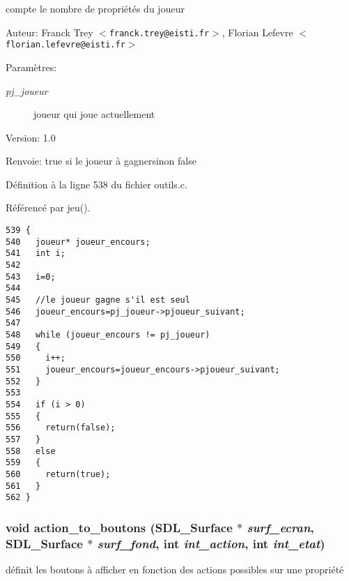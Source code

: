 compte le nombre de propri\'{e}t\'{e}s du joueur 

\begin{Desc}
\item[Auteur:]Franck Trey $<${\tt franck.trey@eisti.fr}$>$, Florian Lefevre $<${\tt florian.lefevre@eisti.fr}$>$\end{Desc}
\begin{Desc}
\item[Param\`{e}tres:]
\begin{description}
\item[{\em pj\_\-joueur}]joueur qui joue actuellement\end{description}
\end{Desc}
\begin{Desc}
\item[Version:]1.0 \end{Desc}
\begin{Desc}
\item[Renvoie:]true si le joueur \`{a} gagnersinon false \end{Desc}


D\'{e}finition \`{a} la ligne 538 du fichier outils.c.

R\'{e}f\'{e}renc\'{e} par jeu().

\begin{Code}\begin{verbatim}539 {
540   joueur* joueur_encours;
541   int i;
542   
543   i=0;
544   
545   //le joueur gagne s'il est seul
546   joueur_encours=pj_joueur->pjoueur_suivant;
547   
548   while (joueur_encours != pj_joueur)
549   {
550     i++;
551     joueur_encours=joueur_encours->pjoueur_suivant;
552   }
553   
554   if (i > 0)
555   {
556     return(false);
557   }
558   else 
559   {
560     return(true);
561   }
562 }
\end{verbatim}\end{Code}


\subsubsection{\setlength{\rightskip}{0pt plus 5cm}void action\_\-to\_\-boutons (SDL\_\-Surface $\ast$ {\em surf\_\-ecran}, SDL\_\-Surface $\ast$ {\em surf\_\-fond}, int {\em int\_\-action}, int {\em int\_\-etat})}\label{outils_8h_a5265e7645b52f6efcbfd18323082a1c}


d\'{e}finit les boutons \`{a} afficher en fonction des actions possibles sur une propri\'{e}t\'{e} 

